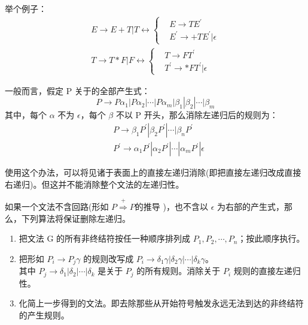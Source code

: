 举个例子：
\begin{equation}
    \begin{aligned}
        E \rightarrow E+T|T \longleftrightarrow
        \left\{
        \begin{aligned}
             & E \rightarrow TE^{'}               \\
             & E^{'} \rightarrow +TE^{'}|\epsilon
        \end{aligned}
        \right. \\
        T \rightarrow T*F|F \longleftrightarrow
        \left\{
        \begin{aligned}
             & T \rightarrow FT^{'}               \\
             & T^{'} \rightarrow *FT^{'}|\epsilon
        \end{aligned}
        \right. \nonumber
    \end{aligned}
\end{equation}

一般而言，假定 P 关于的全部产生式：
\[ P \rightarrow P\alpha_1 | P\alpha_2 | \cdots | P\alpha_m | \beta_1 | \beta_2 | \cdots | \beta_m \]
其中，每个 $\alpha$ 不为 $\epsilon$，每个 $\beta$ 不以 P 开头，那么消除左递归后的规则为：
\begin{equation}
    \begin{aligned}
         & P \rightarrow \beta_1P^{'} | \beta_2P^{'} | \cdots | \beta_nP^{'}                             \\
         & P^{'} \rightarrow \alpha_1P^{'} | \alpha_2P^{'} | \cdots | \alpha_mP^{'} | \epsilon \nonumber
    \end{aligned}
\end{equation}

使用这个办法，可以将见诸于表面上的直接左递归消除(即把直接左递归改成直接右递归)。但这并不能消除整个文法的左递归性。

如果一个文法不含回路(形如 $P \stackrel{+}{\Rightarrow} P 的推导$ )，也不含以 $\epsilon$ 为右部的产生式，那么，下列算法将保证删除左递归。

\begin{enumerate}
    \item 把文法 G 的所有非终结符按任一种顺序排列成 $P_1,P_2,\cdots,P_n$；按此顺序执行。
    \item 把形如 $P_i \rightarrow P_j \gamma$ 的规则改写成 $P_i \rightarrow \delta_1\gamma | \delta_2\gamma | \cdots | \delta_k\gamma$。\\
          其中 $P_j \rightarrow \delta_1 | \delta_2 | \cdots | \delta_k$ 是关于 $P_j$ 的所有规则。消除关于 $P_i$ 规则的直接左递归性。
    \item 化简上一步得到的文法。即去除那些从开始符号触发永远无法到达的非终结符的产生规则。
\end{enumerate}


